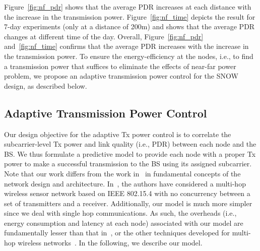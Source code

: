 Figure~\ref{fig:nf_pdr} shows that the average PDR increases at each distance with the increase in the transmission power. Figure~\ref{fig:nf_time} depicts the result for 7-day experiments (only at a distance of 200m) and shows that the average PDR changes at different time of the day. Overall, Figure~\ref{fig:nf_pdr} and~\ref{fig:nf_time} confirms that the average PDR increases with the increase in the transmission power. To ensure the energy-efficiency at the nodes, i.e., to find a  transmission power  that suffices to eliminate the effects of near-far power problem, we propose an adaptive transmission power control for the SNOW design, as described below.



\subsection{Adaptive Transmission Power Control}\label{sec:atpc}
Our design objective for the adaptive Tx power control is to correlate the subcarrier-level Tx power and link quality (i.e., PDR) between each node and the BS. We thus formulate a predictive model to provide each node with a proper Tx power to make a successful transmission to the BS using its assigned subcarrier. Note that our work differs from the work in~\cite{lin2016atpc} in fundamental concepts of the network design and architecture. In~\cite{lin2016atpc}, the authors have considered a multi-hop wireless sensor network based on IEEE 802.15.4 with no concurrency between a set of transmitters and a receiver. Additionally, our model is much more simpler since we deal with single hop communications. As such, the overheads (i.e., energy consumption and latency at each node) associated with our model are fundamentally lesser than that in~\cite{lin2016atpc}, or the other techniques developed for multi-hop wireless networks~\cite{son2006experimental, li2005cone}. In the following, we describe our model.


